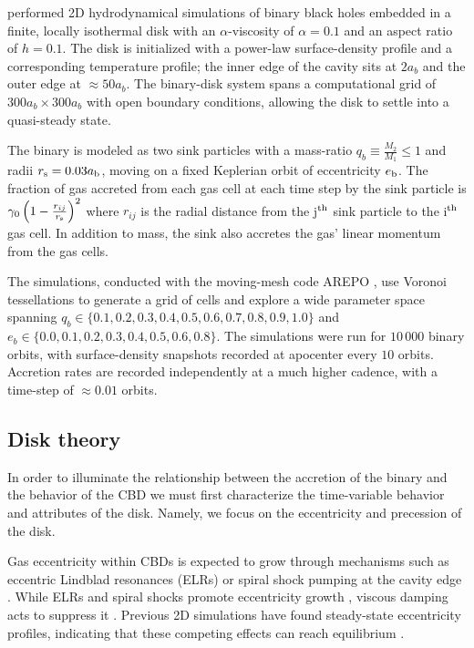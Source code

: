 \documentclass[fleqn,usenatbib]{mnras}
\begin{document}
\citet{siwek_prefacc, siwek_cbdorbevol} performed 2D hydrodynamical simulations of binary black holes embedded in a finite, locally isothermal disk with an $\alpha$-viscosity of $\alpha=0.1$ and an aspect ratio of $h=0.1$. The disk is initialized with a power-law surface-density profile and a corresponding temperature profile; the inner edge of the cavity sits at $2a_b$ and the outer edge at $\approx 50a_b$. The binary-disk system spans a computational grid of $300 a_b \times 300a_b$ with open boundary conditions, allowing the disk to settle into a quasi-steady state. 

The binary is modeled as two sink particles with a mass-ratio $q_b \equiv \frac{M_2}{M_1} \leq 1$ and radii $r_{\rm{s}} = 0.03 a_{\rm{b}}$, moving on a fixed Keplerian orbit of eccentricity $e_{\rm{b}}$. The fraction of gas accreted from each gas cell at each time step by the sink particle is $\gamma_0 \left( 1 - \frac{r_{ij}}{r_{\rm{s}}}\right)^2$ where $r_{ij}$ is the radial distance from the j$^{\rm{th}}$ sink particle to the i$^{\rm{th}}$ gas cell. In addition to mass, the sink also accretes the gas' linear momentum from the gas cells.

The simulations, conducted with the moving-mesh code AREPO \citep{Springel_arepo_10}, use Voronoi tessellations to generate a grid of cells and explore a wide parameter space spanning $q_b \in \{0.1, 0.2, 0.3, 0.4, 0.5, 0.6, 0.7, 0.8, 0.9, 1.0\}$ and $e_b \in \{0.0, 0.1, 0.2, 0.3, 0.4, 0.5, 0.6, 0.8\}$. The simulations were run for $10\,000$ binary orbits, with surface-density snapshots recorded at apocenter every $10$ orbits. Accretion rates are recorded independently at a much higher cadence, with a time-step of $\approx 0.01$ orbits.



\subsection{Disk theory}

In order to illuminate the relationship between the accretion of the binary and the behavior of the CBD we must first characterize the time-variable behavior and attributes of the disk. Namely, we focus on the eccentricity and precession of the disk. 

Gas eccentricity within CBDs is expected to grow through mechanisms such as eccentric Lindblad resonances (ELRs) or spiral shock pumping at the cavity edge \citep{lubow_91, whitehurst_94, paardekooper_2008, kley_2008, shi_2012}. While ELRs and spiral shocks promote eccentricity growth \citep{lubow_91, shi_2012}, viscous damping acts to suppress it \citep{Goodchild_2006}. Previous 2D simulations have found steady-state eccentricity profiles, indicating that these competing effects can reach equilibrium \citep{miranda_munoz_lai_2017, siwek_prefacc}.
\end{document}
